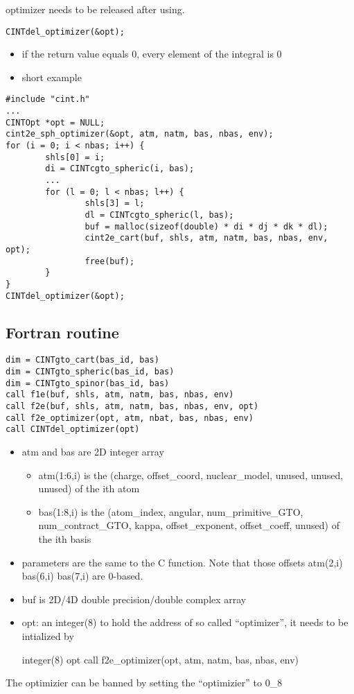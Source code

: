 \documentclass{article}
\begin{document}
optimizer needs to be released after using.

\begin{verbatim}
CINTdel_optimizer(&opt);
\end{verbatim}
\begin{itemize}
\item
  if the return value equals 0, every element of the integral is 0

\item
  short example

\end{itemize}
\begin{verbatim}
#include "cint.h"
...
CINTOpt *opt = NULL;
cint2e_sph_optimizer(&opt, atm, natm, bas, nbas, env);
for (i = 0; i < nbas; i++) {
        shls[0] = i;
        di = CINTcgto_spheric(i, bas);
        ...
        for (l = 0; l < nbas; l++) {
                shls[3] = l;
                dl = CINTcgto_spheric(l, bas);
                buf = malloc(sizeof(double) * di * dj * dk * dl);
                cint2e_cart(buf, shls, atm, natm, bas, nbas, env, opt);
                free(buf);
        }
}
CINTdel_optimizer(&opt);
\end{verbatim}
\subsection{Fortran routine}

\begin{verbatim}
dim = CINTgto_cart(bas_id, bas)
dim = CINTgto_spheric(bas_id, bas)
dim = CINTgto_spinor(bas_id, bas)
call f1e(buf, shls, atm, natm, bas, nbas, env)
call f2e(buf, shls, atm, natm, bas, nbas, env, opt)
call f2e_optimizer(opt, atm, nbat, bas, nbas, env)
call CINTdel_optimizer(opt)
\end{verbatim}
\begin{itemize}
\item
  atm and bas are 2D integer array
  \begin{itemize}
  \item
    atm(1:6,i) is the (charge, offset\_coord, nuclear\_model, unused,
    unused, unused) of the ith atom
  \item
    bas(1:8,i) is the (atom\_index, angular, num\_primitive\_GTO,
    num\_contract\_GTO, kappa, offset\_exponent, offset\_coeff, unused)
    of the ith basis
  \end{itemize}
\item
  parameters are the same to the C function. Note that those offsets
  atm(2,i) bas(6,i) bas(7,i) are 0-based.
\item
  buf is 2D/4D double precision/double complex array
\item
  opt: an integer(8) to hold the address of so called ``optimizer'',
  it needs to be intialized by

  integer(8) opt call f2e\_optimizer(opt, atm, natm, bas, nbas, env)

\end{itemize}
The optimizier can be banned by setting the ``optimizier'' to 0\_8
\end{document}
